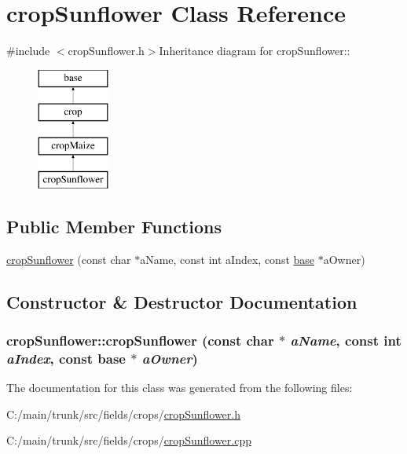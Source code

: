 \hypertarget{classcrop_sunflower}{
\section{cropSunflower Class Reference}
\label{classcrop_sunflower}
}


{\ttfamily \#include $<$cropSunflower.h$>$}Inheritance diagram for cropSunflower::\begin{figure}[H]
\begin{center}
\leavevmode
\includegraphics[height=4cm]{classcrop_sunflower}
\end{center}
\end{figure}
\subsection*{Public Member Functions}
\begin{DoxyCompactItemize}
\item 
\hyperlink{classcrop_sunflower_aaf4c9dafeb53853db49ee1b532c1eeb6}{cropSunflower} (const char $\ast$aName, const int aIndex, const \hyperlink{classbase}{base} $\ast$aOwner)
\end{DoxyCompactItemize}


\subsection{Constructor \& Destructor Documentation}
\hypertarget{classcrop_sunflower_aaf4c9dafeb53853db49ee1b532c1eeb6}{
\subsubsection[{cropSunflower}]{\setlength{\rightskip}{0pt plus 5cm}cropSunflower::cropSunflower (const char $\ast$ {\em aName}, \/  const int {\em aIndex}, \/  const {\bf base} $\ast$ {\em aOwner})}}
\label{classcrop_sunflower_aaf4c9dafeb53853db49ee1b532c1eeb6}


The documentation for this class was generated from the following files:\begin{DoxyCompactItemize}
\item 
C:/main/trunk/src/fields/crops/\hyperlink{crop_sunflower_8h}{cropSunflower.h}\item 
C:/main/trunk/src/fields/crops/\hyperlink{crop_sunflower_8cpp}{cropSunflower.cpp}\end{DoxyCompactItemize}
